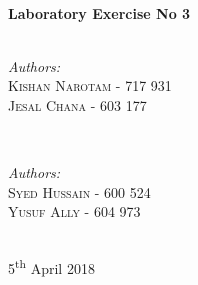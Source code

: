 \documentclass[10pt, conference]{IEEEtran}
\begin{document}
\begin{titlepage}

\HRule \\[0.4cm]
{ \huge \bfseries Laboratory Exercise No 3}\\[0.4cm] %
\HRule \\[1.5cm]
 

\begin{minipage}{0.4\textwidth}
\begin{flushleft} \large
	\emph{Authors:}\\
	\textsc{Kishan Narotam - 717 931\\Jesal Chana - 603 177} 
\end{flushleft}
\end{minipage}
~
\begin{minipage}{0.4\textwidth}
\begin{flushright} \large
	\emph{Authors:} \\
	\textsc{Syed Hussain - 600 524\\Yusuf Ally - 604 973} 
\end{flushright}
\end{minipage}\\[2cm]


{\large 5\textsuperscript{th} April 2018}\\[2cm] %


\vfill %

\end{titlepage}


\end{document}
